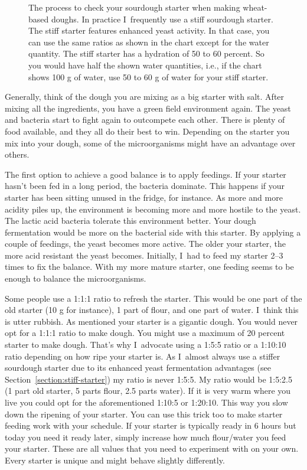 \begin{figure}[!htb]
\begin{center}
  
  \caption{The process to check your sourdough starter when making wheat-based doughs. In practice
  I~frequently use a stiff sourdough starter. The stiff starter features enhanced yeast activity. In that case, you can
  use the same ratios as shown in the chart except for the water quantity. The stiff starter has a hydration of 50 to
  60 percent. So you would have half the shown water quantities, i.e., if the chart shows 100 g of water, use 50 to 60 g of water
  for your stiff starter.}%
  \label{fig:process-starter-wheat-sourdough}
\end{center}
\end{figure}

Generally, think of the dough you are mixing as a big starter with salt.
After mixing all the ingredients, you have a green field environment again.
The yeast and bacteria start to fight again to outcompete each other.
There is plenty of food available, and they all do their best to win.
Depending on the starter you mix into your dough, some of the microorganisms
might have an advantage over others.

The first option to achieve a good balance is to apply feedings.
If your starter hasn't been fed in a long period, the
bacteria dominate. This happens if your starter has been
sitting unused in the fridge, for instance. As more and more
acidity piles up, the environment is becoming more and more hostile
to the yeast. The lactic acid bacteria tolerate this environment
better. Your dough fermentation would be more on the
bacterial side with this starter. By applying a couple of
feedings, the yeast becomes more active. The older your
starter, the more acid resistant the yeast becomes. Initially,
I~had to feed my starter 2--3 times to fix the balance. With my
more mature starter, one feeding seems to be enough to balance
the microorganisms.

Some people use a 1:1:1 ratio to refresh the starter. This would
be one part of the old starter (10 g for instance), 1 part of flour,
and one part of water. I~think this is utter rubbish. As mentioned
your starter is a gigantic dough. You would never opt for a 1:1:1 ratio to
make dough. You might use a maximum of 20 percent starter to
make dough. That's why I~advocate using a 1:5:5 ratio or a
1:10:10 ratio depending on how ripe your starter is. As I~almost
always use a stiffer sourdough starter due to its enhanced
yeast fermentation advantages (see Section~\ref{section:stiff-starter})
my ratio is never 1:5:5. My ratio would be 1:5:2.5 (1 part old starter,
5 parts flour, 2.5 parts water). If it is very warm where you live
you could opt for the aforementioned 1:10:5 or 1:20:10. This
way you slow down the ripening of your starter. You can use this
trick too to make starter feeding work with your schedule.
If your starter is typically ready in 6 hours but today you need it
ready later, simply increase how much flour/water you feed your starter.
These are all values that you need to experiment with on your own.
Every starter is unique and might behave slightly differently.

